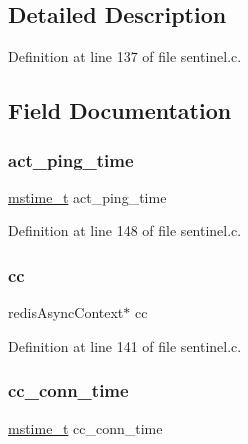 \subsection{Detailed Description}


Definition at line 137 of file sentinel.\+c.



\subsection{Field Documentation}
\mbox{\label{structinstance_link_a96b7748c7ea4249b266bfa7417bcec1d}} 
\subsubsection{\texorpdfstring{act\+\_\+ping\+\_\+time}{act\_ping\_time}}
{\footnotesize\ttfamily \hyperlink{redismodule_8h_a652ae61e2475bc8957454534544968fc}{mstime\+\_\+t} act\+\_\+ping\+\_\+time}



Definition at line 148 of file sentinel.\+c.

\mbox{\label{structinstance_link_a403cc1bb3650a1a12adb31b9d8c8f016}} 
\subsubsection{\texorpdfstring{cc}{cc}}
{\footnotesize\ttfamily redis\+Async\+Context$\ast$ cc}



Definition at line 141 of file sentinel.\+c.

\mbox{\label{structinstance_link_a488300e93393a2d8d6377bb4d46ad104}} 
\subsubsection{\texorpdfstring{cc\+\_\+conn\+\_\+time}{cc\_conn\_time}}
{\footnotesize\ttfamily \hyperlink{redismodule_8h_a652ae61e2475bc8957454534544968fc}{mstime\+\_\+t} cc\+\_\+conn\+\_\+time}



